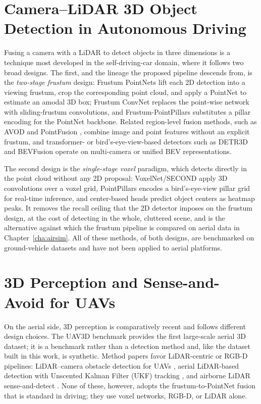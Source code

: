 \section{Camera--LiDAR 3D Object Detection in Autonomous Driving}
\label{sec:slr_driving}

Fusing a camera with a LiDAR to detect objects in three dimensions is a technique
most developed in the self-driving-car domain, where it follows two broad designs. The first, and the
lineage the proposed pipeline descends from, is the \emph{two-stage frustum}
design: Frustum PointNets \cite{qi2018frustum} lift each 2D detection into a
viewing frustum, crop the corresponding point cloud, and apply a PointNet
\cite{qi2017pointnet,qi2017pointnetpp} to estimate an amodal 3D box; Frustum
ConvNet \cite{wang2019fconvnet} replaces the point-wise network with
sliding-frustum convolutions, and Frustum-PointPillars \cite{paigwar2021fpp}
substitutes a pillar encoding for the PointNet backbone. Related region-level
fusion methods, such as AVOD \cite{ku2018avod} and PointFusion
\cite{xu2018pointfusion}, combine image and point features without an explicit
frustum, and transformer- or bird's-eye-view-based detectors such as DETR3D
\cite{wang2022detr3d} and BEVFusion \cite{liu2023bevfusion} operate on
multi-camera or unified BEV representations.

The second design is the \emph{single-stage voxel} paradigm, which detects
directly in the point cloud without any 2D proposal: VoxelNet/SECOND
\cite{yan2018second} apply 3D convolutions over a voxel grid, PointPillars
\cite{lang2019pointpillars} encodes a bird's-eye-view pillar grid for real-time
inference, and center-based heads \cite{zhou2019objects} predict object centers as
heatmap peaks. It removes the recall ceiling that the 2D detector imposes on the
frustum design, at the cost of detecting in the whole, cluttered scene, and is the
alternative against which the frustum pipeline is compared on aerial data in
Chapter~\ref{cha:airsim}. All of these methods, of both designs, are benchmarked
on ground-vehicle datasets and have not been applied to aerial platforms.

\section{3D Perception and Sense-and-Avoid for UAVs}

On the aerial side, 3D perception is comparatively recent and follows different
design choices. The UAV3D benchmark \cite{ye2024uav3d} provides the first
large-scale aerial 3D dataset; it is a benchmark rather than a detection method
and, like the dataset built in this work, is synthetic. Method papers favor
LiDAR-centric or RGB-D pipelines:
LiDAR--camera obstacle detection for UAVs \cite{ma2021uavfusion}, aerial
LiDAR-based detection with Unscented Kalman Filter (UKF) tracking
\cite{cherif2023aerial}, and airborne LiDAR sense-and-detect \cite{dolph2023airborne}.
None of these, however, adopts the frustum-to-PointNet fusion that is
standard in driving; they use voxel networks, RGB-D, or LiDAR alone.

